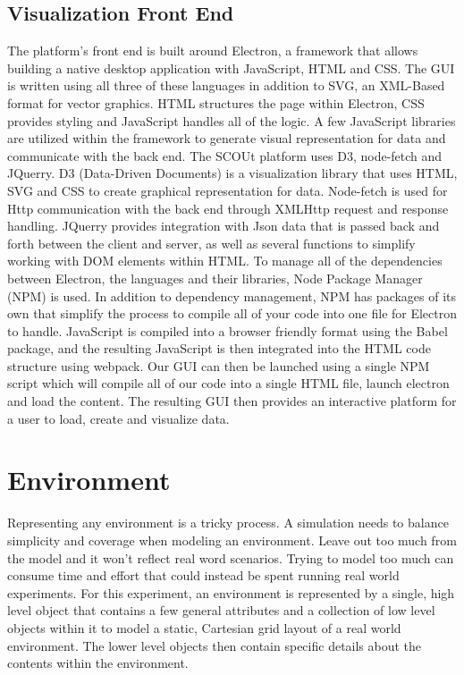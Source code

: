 \subsection{Visualization Front End}
The platform's front end is built around Electron,  a framework that allows building a native desktop application with JavaScript, HTML and CSS.
The GUI is written using all three of these languages in addition to SVG, an XML-Based format for vector graphics.
HTML structures the page within Electron, CSS provides styling and JavaScript handles all of the logic.
A few JavaScript libraries are utilized within the framework to generate visual representation for data and communicate with the back end.
The SCOUt platform uses D3, node-fetch and JQuerry. 
D3 (Data-Driven Documents) is a visualization library that uses HTML, SVG and CSS to create graphical representation for data.
Node-fetch is used for Http communication with the back end through XMLHttp request and response handling.
JQuerry provides integration with Json data that is passed back and forth between the client and server, as well as several functions to simplify working with DOM elements within HTML.
To manage all of the dependencies between Electron, the languages and their libraries, Node Package Manager (NPM)  is used.
In addition to dependency management, NPM has packages of its own that simplify the process to compile all of your code into one file for Electron to handle.
JavaScript is compiled into a browser friendly format using the Babel package, and the resulting JavaScript is then integrated into the HTML code structure using webpack.
Our GUI can then be launched using a single NPM script which will compile all of our code into a single HTML file, launch electron and load the content.
The resulting GUI then provides an interactive platform for a user to load, create and visualize data.



\section{Environment}
Representing any environment is a tricky process.
A simulation needs to balance simplicity and coverage when modeling an environment.
Leave out too much from the model and it won’t reflect real word scenarios.
Trying to model too much can consume time and effort that could instead be spent running real world experiments.
For this experiment, an environment is represented by a single, high level object that contains a few general attributes and a collection of low level objects within it to model a static, Cartesian grid layout of a real world environment.
The lower level objects then contain specific details about the contents within the environment.

